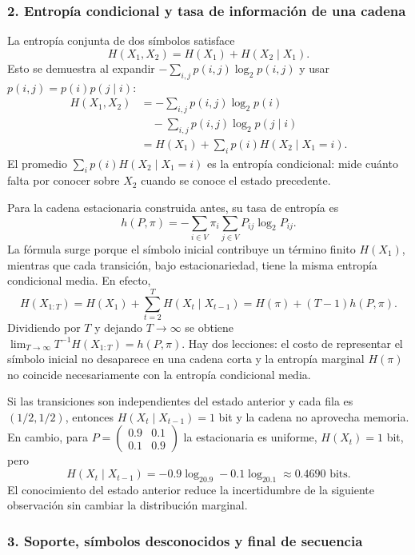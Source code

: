 \subsubsection*{2. Entropía condicional y tasa de información de una cadena}

La entropía conjunta de dos símbolos satisface
\[
H(X_1,X_2)=H(X_1)+H(X_2\mid X_1).
\]
Esto se demuestra al expandir
$-\sum_{i,j}p(i,j)\log_2 p(i,j)$ y usar
$p(i,j)=p(i)p(j\mid i)$:
\[
\begin{split}
H(X_1,X_2)&=-\sum_{i,j}p(i,j)\log_2p(i)\\
&\quad-\sum_{i,j}p(i,j)\log_2p(j\mid i)\\
&=H(X_1)+\sum_i p(i)H(X_2\mid X_1=i).
\end{split}
\]
El promedio $\sum_i p(i)H(X_2\mid X_1=i)$ es
la entropía condicional: mide cuánto falta por conocer sobre $X_2$
cuando se conoce el estado precedente.

Para la cadena estacionaria construida antes, su tasa de entropía es
\[
h(P,\pi)=-\sum_{i\in V}\pi_i\sum_{j\in V}P_{ij}\log_2P_{ij}.
\]
La fórmula surge porque el símbolo inicial contribuye un término finito
$H(X_1)$, mientras que cada transición, bajo estacionariedad, tiene
la misma entropía condicional media. En efecto,
\[
H(X_{1:T})=H(X_1)+\sum_{t=2}^T H(X_t\mid X_{t-1})
=H(\pi)+(T-1)h(P,\pi).
\]
Dividiendo por $T$ y dejando $T\to\infty$ se obtiene
$\lim_{T\to\infty}T^{-1}H(X_{1:T})=h(P,\pi)$.
Hay dos lecciones: el costo de representar el símbolo inicial
no desaparece en una cadena corta y la entropía marginal $H(\pi)$
no coincide necesariamente con la entropía condicional media.

\begin{ejemplo}
Si las transiciones son independientes del estado anterior y cada fila
es $(1/2,1/2)$, entonces $H(X_t\mid X_{t-1})=1$ bit y la cadena
no aprovecha memoria. En cambio, para
$P=\left(\begin{smallmatrix}0.9&0.1\\0.1&0.9\end{smallmatrix}\right)$
la estacionaria es uniforme, $H(X_t)=1$ bit, pero
\[
H(X_t\mid X_{t-1})=-0.9\log_20.9-0.1\log_20.1\approx0.4690
\text{ bits}.
\]
El conocimiento del estado anterior reduce la incertidumbre de
la siguiente observación sin cambiar la distribución marginal.
\end{ejemplo}

\subsubsection*{3. Soporte, símbolos desconocidos y final de secuencia}

